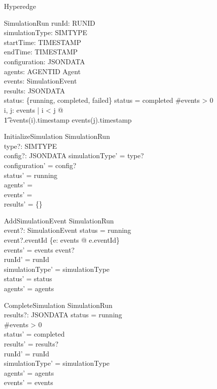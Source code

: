 \documentclass{article}
\begin{document}
\begin{class}{Hyperedge}
\begin{class}{SimulationRun}
    runId: RUNID \\
    simulationType: SIMTYPE \\
    startTime: TIMESTAMP \\
    endTime: TIMESTAMP \\
    configuration: JSONDATA \\
    agents: AGENTID \pfun Agent \\
    events: \seq SimulationEvent \\
    results: JSONDATA \\
    status: \{running, completed, failed\}
\where
    status = completed \implies \#events > 0 \\
    \forall i, j: \dom events | i < j @ \\
    \t1 events(i).timestamp \leq events(j).timestamp
\end{class}

\begin{schema}{InitializeSimulation}
    \Delta SimulationRun \\
    type?: SIMTYPE \\
    config?: JSONDATA
\where
    simulationType' = type? \\
    configuration' = config? \\
    status' = running \\
    agents' = \emptyset \\
    events' = \langle \rangle \\
    results' = \{\}
\end{schema}

\begin{schema}{AddSimulationEvent}
    \Delta SimulationRun \\
    event?: SimulationEvent
\where
    status = running \\
    event?.eventId \notin \{e: \ran events @ e.eventId\} \\
    events' = events \cat \langle event? \rangle \\
    runId' = runId \\
    simulationType' = simulationType \\
    status' = status \\
    agents' = agents
\end{schema}

\begin{schema}{CompleteSimulation}
    \Delta SimulationRun \\
    results?: JSONDATA
\where
    status = running \\
    \#events > 0 \\
    status' = completed \\
    results' = results? \\
    runId' = runId \\
    simulationType' = simulationType \\
    agents' = agents \\
    events' = events
\end{schema}


\end{class}
\end{document}
